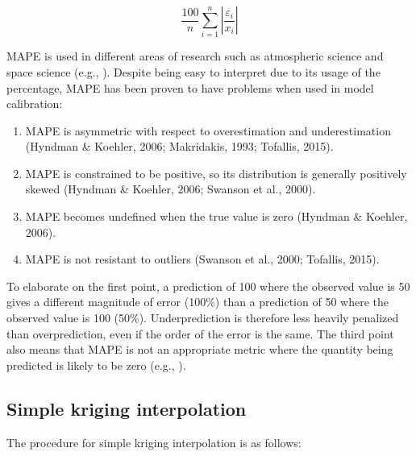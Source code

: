 \documentclass[a4paper,fleqn]{cas-sc}
\begin{document}
    \begin{equation}
    \frac{100}{n} \sum_{i=1}^{n} \left | \frac{\varepsilon_{i}}{x_{i}}  \right |
    \end{equation}
    
    MAPE is used in different areas of research such as atmospheric science and space science (e.g., \cite{grillakis2013multisegment, zheng2015linear, zhelavskaya2016automated}). Despite being easy to interpret due to its usage of the percentage, MAPE has been proven to have problems when used in model calibration:
    
    \begin{enumerate}
    
        \item MAPE is asymmetric with respect to overestimation and underestimation (Hyndman \& Koehler, 2006; Makridakis, 1993; Tofallis, 2015).
        
        \item MAPE is constrained to be positive, so its distribution is generally positively skewed (Hyndman \& Koehler, 2006; Swanson et al., 2000).
        
        \item MAPE becomes undefined when the true value is zero (Hyndman \& Koehler, 2006). 
        
        \item MAPE is not resistant to outliers (Swanson et al., 2000; Tofallis, 2015).
        
    \end{enumerate}
    
    To elaborate on the first point, a prediction of 100 where the observed value is 50 gives a different magnitude of error (100\%) than a prediction of 50 where the observed value is 100 (50\%). Underprediction is therefore less heavily penalized than overprediction, even if the order of the error is the same. The third point also means that MAPE is not an appropriate metric where the quantity being predicted is likely to be zero (e.g., \cite{tofallis2015better}).%
    

\subsection{Simple kriging interpolation}\label{supp-c}

The procedure for simple kriging interpolation is as follows:
\end{document}
